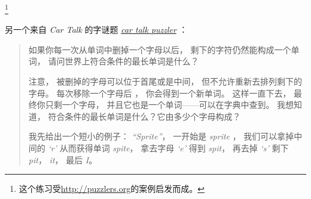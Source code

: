 {\begin{exercise}
\footnote{这个练习受\href{http://puzzlers.org}{http://puzzlers.org}的案例启发而成。  }

\end{exercise}


\begin{exercise}


另一个来自 {\em Car Talk} 的字谜题 \href{http://www.cartalk.com/content/puzzlers}{{\em car talk puzzler}} ：

\begin{quote}

如果你每一次从单词中删掉一个字母以后， 剩下的字符仍然能构成一个单词， 请问世界上符合条件的最长单词是什么？

注意， 被删掉的字母可以位于首尾或是中间， 但不允许重新去排列剩下的字母。
每次移除一个字母后 ， 你会得到一个新单词。
这样一直下去， 最终你只剩一个字母， 并且它也是一个单词——可以在字典中查到。  我想知道， 符合条件的最长单词是什么？它由多少个字母构成？

我先给出一个短小的例子： {\em ``Sprite''}， 一开始是 {\em sprite} ， 我们可以拿掉中间的 {\em `r'} 从而获得单词 {\em spite}， 拿去字母 {\em `e'} 得到 {\em spit}， 再去掉 {\em `s'} 剩下 {\em pit}， {\em it}， 最后 {\em I}。
\end{quote}

 



\end{exercise}}
